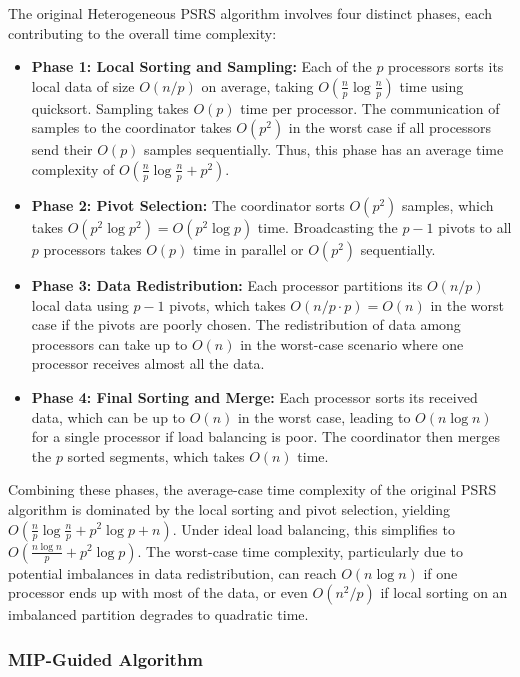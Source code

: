 \documentclass[]{interact}
\theoremstyle{plain}
\theoremstyle{definition}
\theoremstyle{remark}
\begin{document}
The original Heterogeneous PSRS algorithm involves four distinct phases, each contributing to the overall time complexity:

\begin{itemize}
    \item \textbf{Phase 1: Local Sorting and Sampling:} Each of the $p$ processors sorts its local data of size $O(n/p)$ on average, taking $O\left(\frac{n}{p} \log \frac{n}{p}\right)$ time using quicksort. Sampling takes $O(p)$ time per processor. The communication of samples to the coordinator takes $O(p^2)$ in the worst case if all processors send their $O(p)$ samples sequentially. Thus, this phase has an average time complexity of $O\left(\frac{n}{p} \log \frac{n}{p} + p^2\right)$.
    \item \textbf{Phase 2: Pivot Selection:} The coordinator sorts $O(p^2)$ samples, which takes $O(p^2 \log p^2) = O(p^2 \log p)$ time. Broadcasting the $p - 1$ pivots to all $p$ processors takes $O(p)$ time in parallel or $O(p^2)$ sequentially.
    \item \textbf{Phase 3: Data Redistribution:} Each processor partitions its $O(n/p)$ local data using $p - 1$ pivots, which takes $O(n/p \cdot p) = O(n)$ in the worst case if the pivots are poorly chosen. The redistribution of data among processors can take up to $O(n)$ in the worst-case scenario where one processor receives almost all the data.
    \item \textbf{Phase 4: Final Sorting and Merge:} Each processor sorts its received data, which can be up to $O(n)$ in the worst case, leading to $O(n \log n)$ for a single processor if load balancing is poor. The coordinator then merges the $p$ sorted segments, which takes $O(n)$ time.
\end{itemize}



Combining these phases, the average-case time complexity of the original PSRS algorithm is dominated by the local sorting and pivot selection, yielding $O\left(\frac{n}{p} \log \frac{n}{p} + p^2 \log p + n\right)$. Under ideal load balancing, this simplifies to $O\left(\frac{n \log n}{p} + p^2 \log p\right)$. The worst-case time complexity, particularly due to potential imbalances in data redistribution, can reach $O(n \log n)$ if one processor ends up with most of the data, or even $O(n^2/p)$ if local sorting on an imbalanced partition degrades to quadratic time.

\subsubsection{MIP-Guided Algorithm}
\end{document}
